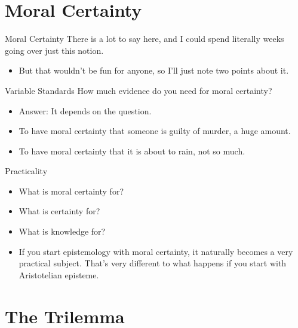\documentclass[
  17pt,
  letterpaper,
  ignorenonframetext,
  aspectratio=169,
]{beamer}
\providecommand{\tightlist}{%
  \setlength{\itemsep}{0pt}\setlength{\parskip}{0pt}}\usepackage{longtable,booktabs,array}
\begin{document}
\hypertarget{moral-certainty}{%
\section{Moral Certainty}\label{moral-certainty}}

\begin{frame}{Moral Certainty}
\protect\hypertarget{moral-certainty-1}{}
There is a lot to say here, and I could spend literally weeks going over
just this notion.

\begin{itemize}[<+->]
\tightlist
\item
  But that wouldn't be fun for anyone, so I'll just note two points
  about it.
\end{itemize}
\end{frame}

\begin{frame}{Variable Standards}
\protect\hypertarget{variable-standards}{}
How much evidence do you need for moral certainty?

\begin{itemize}[<+->]
\tightlist
\item
  Answer: It depends on the question.
\item
  To have moral certainty that someone is guilty of murder, a huge
  amount.
\item
  To have moral certainty that it is about to rain, not so much.
\end{itemize}
\end{frame}

\begin{frame}{Practicality}
\protect\hypertarget{practicality}{}
\begin{itemize}[<+->]
\item
  What is moral certainty for?
\item
  What is certainty for?
\item
  What is knowledge for?
\item
  If you start epistemology with moral certainty, it naturally becomes a
  very practical subject. That's very different to what happens if you
  start with Aristotelian episteme.
\end{itemize}
\end{frame}

\hypertarget{the-trilemma}{%
\section{The Trilemma}\label{the-trilemma}}
\end{document}
